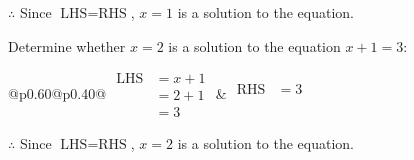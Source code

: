 \documentclass[12pt]{article}
\newcounter{minipagecount}
\begin{document}
\begin{multicols}{2}
\begin{minipage}[t]{0.40\textwidth}
    \noindent \(\therefore\) Since \(\text{LHS} = \text{RHS}\), \(x = 1\) is  a solution to the equation.

\end{minipage}

 \vspace*{16pt}
\noindent{(\theminipagecount)}\hspace{0.1mm} %
\begin{minipage}[t]{0.40\textwidth} %

    \noindent Determine whether \(x = 2\) is a solution to the equation \(x + 1 = 3\):
    \vspace{4pt}  %

    \noindent
    \renewcommand{\arraystretch}{1.3} %
    \begin{tabular}{@{}p{0.60\linewidth}@{}p{0.40\linewidth}@{}}
        \(\begin{aligned}
            \text{LHS} &= x + 1 \\
                    &= 2 + 1 \\
                    &= 3
        \end{aligned}\) &
        \(\begin{aligned}
            \text{RHS} &= 3\\
                    & \\
                    &
        \end{aligned}\)
    \end{tabular}
    \renewcommand{\arraystretch}{1.0} %
    \vspace{2pt}  %

    \noindent \(\therefore\) Since \(\text{LHS} = \text{RHS}\), \(x = 2\) is  a solution to the equation.

\end{minipage}

 \vspace*{16pt}
\columnbreak
\noindent{(\theminipagecount)}\hspace{0.1mm} %
\begin{minipage}[t]{0.40\textwidth} %


\end{minipage}
\end{multicols}
\end{document}
